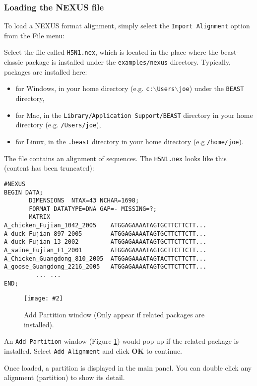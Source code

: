 \documentclass{article}
\newcommand{\includeimage}[2][]{%
\texttt{[image: \#2]}
}
\begin{document}
\subsubsection*{Loading the NEXUS file }

To load a NEXUS format alignment, simply select the \texttt{Import
Alignment} option from the File menu: 

Select the file called \texttt{H5N1.nex}, which is located in the place where the beast-classic package is installed 
under the {\tt examples/nexus} directory. Typically, packages are installed here:
\begin{itemize}
\item for Windows, in your home directory (e.g. {\tt c:$\backslash$Users$\backslash$joe}) under the {\tt BEAST} directory,
\item for Mac, in the {\tt Library/Application Support/BEAST} directory in your home directory (e.g. {\tt /Users/joe}),
\item for Linux, in the {\tt .beast} directory in your home directory (e.g {\tt /home/joe}).
\end{itemize}

The file contains an alignment of sequences. The \texttt{H5N1.nex} looks like this (content has been truncated):

\begin{verbatim}
#NEXUS
BEGIN DATA;
       DIMENSIONS  NTAX=43 NCHAR=1698;
       FORMAT DATATYPE=DNA GAP=- MISSING=?;
       MATRIX 	
A_chicken_Fujian_1042_2005    ATGGAGAAAATAGTGCTTCTTCTT...
A_duck_Fujian_897_2005        ATGGAGAAAATAGTGCTTCTTCTT...
A_duck_Fujian_13_2002         ATGGAGAAAATAGTGCTTCTTCTT...
A_swine_Fujian_F1_2001        ATGGAGAAAATAGTGCTTCTTCTT...
A_Chicken_Guangdong_810_2005  ATGGAGAAAATAGTACTTCTTCTT...
A_goose_Guangdong_2216_2005   ATGGAGAAAATAGTGCTTCTTCTT...
         ... ...
END;
\end{verbatim}

\begin{figure}
\centering	
\includeimage[width=0.5\textwidth]{figures/AddPartition}
\caption{Add Partition window (Only appear if related packages are installed).}
\label{fig:addPartition}
\end{figure}

An \texttt{Add Partition} window (Figure \ref{fig:addPartition}) would pop up if the related package is installed. Select \texttt{Add Alignment} and click \textbf{OK} to continue.

Once loaded, a partition is displayed in the main panel.
You can double click any alignment (partition) to show its detail.
\end{document}
